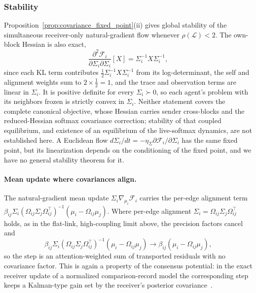 \subsubsection{Stability}

Proposition~\ref{prop:covariance_fixed_point}(ii) gives global stability of the simultaneous receiver-only natural-gradient flow whenever $\rho(\mathcal{L}) < 2$. The own-block Hessian is also exact,
\begin{equation}
\frac{\partial^2 \mathcal{F}_i}{\partial \Sigma_i \partial \Sigma_i}[X]
= \Sigma_i^{-1} X \Sigma_i^{-1},
\end{equation}
since each KL term contributes $\tfrac{1}{2}\Sigma_i^{-1}X\Sigma_i^{-1}$ from its log-determinant, the self and alignment weights sum to $2 \times \tfrac{1}{2} = 1$, and the trace and observation terms are linear in $\Sigma_i$. It is positive definite for every $\Sigma_i \succ 0$, so each agent's problem with its neighbors frozen is strictly convex in $\Sigma_i$. Neither statement covers the complete canonical objective, whose Hessian carries sender cross-blocks and the reduced-Hessian softmax covariance correction; stability of that coupled equilibrium, and existence of an equilibrium of the live-softmax dynamics, are not established here. A Euclidean flow $d\Sigma_i/dt = -\eta_\Sigma\partial\mathcal{F}_i/\partial\Sigma_i$ has the same fixed point, but its linearization depends on the conditioning of the fixed point, and we have no general stability theorem for it.

\paragraph{Mean update where covariances align.}
The natural-gradient mean update $\Sigma_i\nabla_{\mu_i}\mathcal{F}_i$ carries the per-edge alignment term $\beta_{ij} \Sigma_i (\Omega_{ij}\Sigma_j\Omega_{ij}^\top)^{-1}(\mu_i - \Omega_{ij}\mu_j)$. Where per-edge alignment $\Sigma_i = \Omega_{ij}\Sigma_j\Omega_{ij}^\top$ holds, as in the flat-link, high-coupling limit above, the precision factors cancel and
\begin{equation}
\beta_{ij} \Sigma_i (\Omega_{ij}\Sigma_j\Omega_{ij}^\top)^{-1}(\mu_i - \Omega_{ij}\mu_j) \longrightarrow \beta_{ij}(\mu_i - \Omega_{ij}\mu_j),
\end{equation}
so the step is an attention-weighted sum of transported residuals with no covariance factor. This is again a property of the consensus potential: in the exact receiver update of a normalized comparison-record model the corresponding step keeps a Kalman-type gain set by the receiver's posterior covariance~\cite[Ch.~6, exact receiver update]{DennisGaugeVFE2026}.

